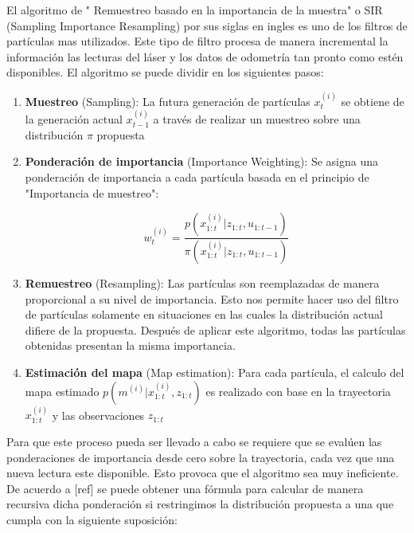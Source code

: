 \documentclass[10pt,a4paper]{article}
\begin{document}
El algoritmo de " Remuestreo basado en la importancia de la muestra" o SIR (Sampling Importance Resampling) por sus siglas en ingles es uno de los filtros de partículas mas utilizados. Este tipo de filtro procesa de manera incremental la información las lecturas del láser y los datos de odometría tan pronto como estén disponibles. El algoritmo se puede dividir en los siguientes pasos:

\begin{enumerate}

	\item \textbf{Muestreo} (Sampling): La futura generación de partículas {$ x_{t}^{(i)} $} se obtiene de la generación actual {$ x_{t-1}^{(i)} $} a través de realizar un muestreo sobre una distribución $ \pi $ propuesta

	\item \textbf{Ponderación de importancia} (Importance Weighting): Se asigna una ponderación de importancia a cada partícula basada en el principio de "Importancia de muestreo":

	\begin{equation}
	\label{eq:weigth}
		w_{t}^{(i)} = 
			\frac{ p( x_{1:t}^{(i)} | z_{1:t}, u_{1:t-1} ) }
				{ \pi ( x_{1:t}^{(i)} | z_{1:t}, u_{1:t-1} ) }
	\end{equation}
	
	\item \textbf{Remuestreo} (Resampling): Las partículas son reemplazadas de manera proporcional a su nivel de importancia. Esto nos permite hacer uso del filtro de partículas solamente en situaciones en las cuales la distribución actual difiere de la propuesta. Después de aplicar este algoritmo, todas las partículas obtenidas presentan la misma importancia.
	
	\item \textbf{Estimación del mapa} (Map estimation): Para cada partícula, el  calculo del mapa estimado $ p( m^{(i)} | x_{1:t}^{(i)}, z_{1:t}) $ es realizado con base en la trayectoria $ x_{1:t}^{(i)} $ y las observaciones $ z_{1:t} $ 

\end{enumerate}

Para que este proceso pueda ser llevado a cabo se requiere que se evalúen las ponderaciones de importancia desde cero sobre la trayectoria, cada vez que una nueva lectura este disponible. Esto provoca que el algoritmo sea muy ineficiente. De acuerdo a [ref] se puede obtener una fórmula para calcular de manera recursiva dicha ponderación si restringimos la distribución propuesta a una que cumpla con la siguiente suposición:
\end{document}
